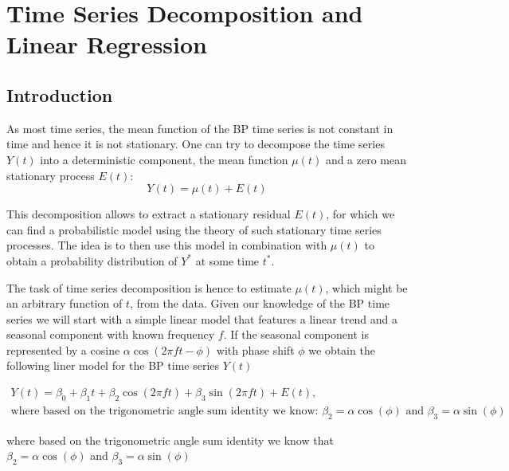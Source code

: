 \usepackage{amsfonts}%


\chapter{Time Series Decomposition and Linear Regression}\label{ch:time-series-decomposition-and-regression}


\section{Introduction}

As most time series, the mean function of the BP time series is not constant in time and hence it is not stationary.
One can try to decompose the time series $Y(t)$ into a deterministic component, the mean function $\mu(t)$
and a zero mean stationary process $E(t)$:
\[ Y(t)= \mu(t) + E(t) \]

This decomposition allows to extract a stationary residual $E(t)$, for which we can find a probabilistic model
using the theory of such stationary time series processes. The idea is to then use this model in combination
with $\mu(t)$ to obtain a probability distribution of $Y^{\ast}$ at some time $t^{\ast}$.

The task of time series decomposition is hence to estimate $\mu(t)$, which might be an arbitrary function of $t$, from the data.
Given our knowledge of the BP time series we will start with a simple linear model that
features a linear trend and a seasonal component with known frequency $f$.
If the seasonal component is represented by a cosine $\alpha \cos(2 \pi f t - \phi)$ with phase shift $\phi$ we obtain the
following liner model for the BP time series $Y(t)$

\begin{gather*}
Y(t) = \beta_0 + \beta_1 t + \beta_2 \cos(2 \pi f t) + \beta_3 \sin(2 \pi f t) + E(t), \\
\text{where based on the trigonometric angle sum identity we know: $\beta_2 = \alpha \cos(\phi)$ and $\beta_3 = \alpha \sin(\phi)$}
\end{gather*}

where based on the trigonometric angle sum identity we know that $\beta_2 = \alpha \cos(\phi)$ and $\beta_3 = \alpha \sin(\phi)$

